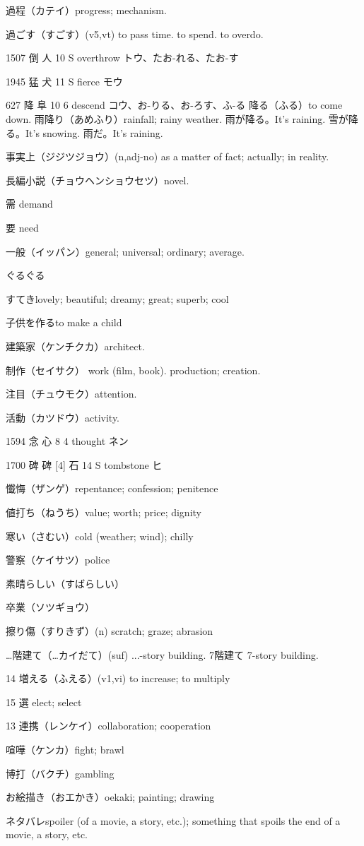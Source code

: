 過程（カテイ）progress; mechanism.

過ごす（すごす）(v5,vt) to pass time. to spend. to overdo.

1507	倒		人	10	S		overthrow	トウ、たお-れる、たお-す

1945	猛		犬	11	S		fierce	モウ

627	降		阜	10	6		descend	コウ、お-りる、お-ろす、ふ-る
降る（ふる）to come down.
雨降り（あめふり）rainfall; rainy weather.
雨が降る。It's raining.
雪が降る。It's snowing.
雨だ。It's raining.

事実上（ジジツジョウ）(n,adj-no)
as a matter of fact; actually; in reality.

長編小説（チョウヘンショウセツ）novel.

需 demand

要 need

一般（イッパン）general; universal; ordinary; average.

ぐるぐる

すてきlovely; beautiful; dreamy; great; superb; cool


子供を作るto make a child

建築家（ケンチクカ）architect.

制作（セイサク）
work (film, book).
production; creation.

注目（チュウモク）attention.

活動（カツドウ）activity.

1594	念		心	8	4		thought	ネン

1700	碑	碑 [4]	石	14	S		tombstone	ヒ

懺悔（ザンゲ）repentance; confession; penitence

値打ち（ねうち）value; worth; price; dignity

寒い（さむい）cold (weather; wind); chilly

警察（ケイサツ）police

素晴らしい（すばらしい）

卒業（ソツギョウ）

擦り傷（すりきず）(n) scratch; graze; abrasion

…階建て（…カイだて）(suf) ...-story building.
7階建て 7-story building.

14 増える（ふえる）(v1,vi) to increase; to multiply

15 選 elect; select

13 連携（レンケイ）collaboration; cooperation

喧嘩（ケンカ）fight; brawl

博打（バクチ）gambling

お絵描き（おエかき）oekaki; painting; drawing

ネタバレspoiler (of a movie, a story, etc.); something that spoils the end of a movie, a story, etc.

